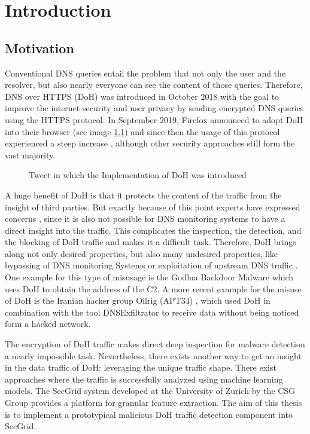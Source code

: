 \chapter{Introduction} \label{introduction}

\section{Motivation} \label{motivation}
Conventional DNS queries entail the problem that not only the user and the resolver, but also nearly everyone can see the content of those queries. Therefore, DNS over HTTPS (DoH) was introduced in October 2018 with the goal to improve the internet security and user privacy by sending encrypted DNS queries using the HTTPS protocol. In September 2019, Firefox announced to adopt DoH into their browser \cite{TweetFirefox} (see image \ref{fig:tweet_ghacks}) and since then the usage of this protocol experienced a steep increase \cite{GarciaEtAl_LargeScaleMEasurement}, although other security approaches still form the vast majority.

\begin{figure} [h]
\centering
\caption{Tweet \cite{TweetFirefox} in which the Implementation of DoH was introduced}
\label{fig:tweet_ghacks}
\end{figure}

A huge benefit of DoH is that it protects the content of the traffic from the insight of third parties. But exactly because of this point experts have expressed concerns \cite{Blog_PrevalenceOfDoH}, since it is also not possible for DNS monitoring systems to have a direct insight into the traffic. This complicates the inspection, the detection, and the blocking of DoH traffic and makes it a difficult task. Therefore, DoH brings along not only desired properties, but also many undesired properties, like bypassing of DNS monitoring Systems or exploitation of upstream DNS traffic \cite{NSA_AdoptingEncryptedDNS}. One example for this type of misusage is the Godlua Backdoor Malware \cite{GodluaBackdoor} which uses DoH to obtain the address of the C2. A more recent example for the misuse of DoH is the Iranian hacker group Oilrig (APT34) \cite{Oilrig}, which used DoH in combination with the tool DNSExfiltrator \cite{DNSExfiltrator} to receive data without being noticed form a hacked network.

The encryption of DoH traffic makes direct deep inspection for malware detection a nearly impossible task. Nevertheless, there exists another way to get an insight in the data traffic of DoH: leveraging the unique traffic shape. There exist approaches where the traffic is successfully analyzed using machine learning models. The SecGrid \cite{SecGrid} system developed at the University of Zurich by the CSG Group provides a platform for granular feature extraction. The aim of this thesis is to implement a prototypical malicious DoH traffic detection component into SecGrid.


